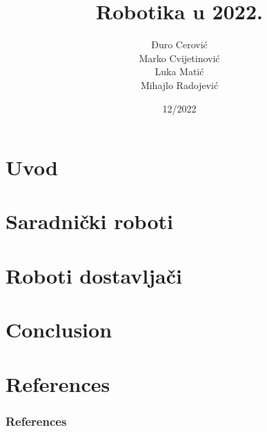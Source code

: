 \documentclass{beamer}
\title{Robotika u 2022.}
\subtitle{}
\institute[Tehničko i naučno pisanje]{Matematički fakultet\\Univerziteta u Beogradu}
\author[]{Đuro Cerović\\Marko Cvijetinović\\Luka Matić\\Mihajlo Radojević}
\date{12/2022}
\begin{document}
\begin{frame}
\titlepage
\end{frame}


\section{Uvod}


\section{Saradnički roboti}


\section{Roboti dostavljači}


\section{Conclusion}



\section*{References}
\begin{frame}
    \frametitle{References}
    
    
\end{frame}
\end{document}
